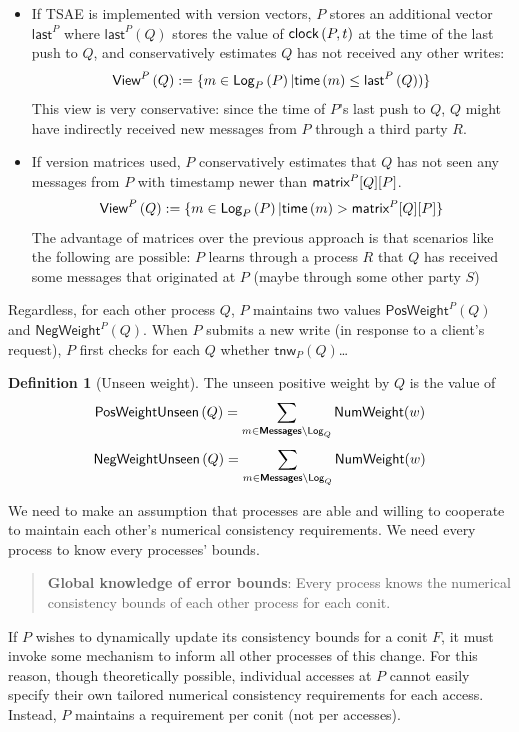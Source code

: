 \documentclass[]             %
{NASA}                       %
\theoremstyle{definition}
\newtheorem{definition}[theorem]{Definition}
\begin{document}
\begin{itemize}
\item If TSAE is implemented with version vectors, $P$ stores an
  additional vector $\mathsf{last}^P$ where $\mathsf{last}^P(Q)$
  stores the value of $\textsf{clock}\left(P,t\right)$ at the time of the last push to
  $Q$, and conservatively estimates $Q$ has not received any other
  writes:
  \[ \textsf{View}^{P}\left(Q\right) := \{ m \in \textsf{Log}_{P}\left(P\right) | \mathsf{time}\left(m\right) \leq
    \mathsf{last}^P\left(Q)\right) \}\] This view is very
  conservative: since the time of $P$'s last push to $Q$, $Q$ might
  have indirectly received new messages from $P$ through a third party
  $R$.
\item If version matrices used, $P$ conservatively estimates that $Q$
  has not seen any messages from $P$ with timestamp newer than
  $\textsf{matrix}^{P}[Q][P]$.
  \[ \textsf{View}^{P}\left(Q\right) := \{ m \in \textsf{Log}_{P}\left(P\right) | \mathsf{time}\left(m\right) >
    \textsf{matrix}^{P}[Q][P] \} \] The advantage of matrices over the
  previous approach is that scenarios like the following are possible:
  $P$ learns through a process $R$ that $Q$ has received some messages
  that originated at $P$ (maybe through some other party $S$)
\end{itemize}
Regardless, for each other process $Q$, $P$ maintains two values
$\mathsf{PosWeight}^{P}(Q)$ and $\mathsf{NegWeight}^{P}(Q)$. When $P$
submits a new write (in response to a client's request), $P$ first
checks for each $Q$ whether $\mathsf{tnw}_{P}(Q)$\ldots

\begin{definition}[Unseen weight]
  The unseen positive weight by $Q$ is the value of
  \[ \mathsf{PosWeightUnseen}\left(Q\right) = \sum_{m \in \textbf{\textsf{Messages}} \setminus \textsf{Log}_{Q}} \mathsf{NumWeight}(w) \]
  \[ \mathsf{NegWeightUnseen}\left(Q\right) = \sum_{m \in \textbf{\textsf{Messages}} \setminus \textsf{Log}_{Q}} \mathsf{NumWeight}(w) \]
\end{definition}

We need to make an assumption that processes are able and willing to
cooperate to maintain each other's numerical consistency requirements.
We need every process to know every processes' bounds.
\begin{quote}
  \textbf{Global knowledge of error bounds}: Every process knows the
  numerical consistency bounds of each other process for each conit.
\end{quote}
If $P$ wishes to dynamically update its consistency bounds for a conit
$F$, it must invoke some mechanism to inform all other processes of
this change. For this reason, though theoretically possible,
individual accesses at $P$ cannot easily specify their own tailored
numerical consistency requirements for each access. Instead, $P$
maintains a requirement per conit (not per accesses).
\end{document}

